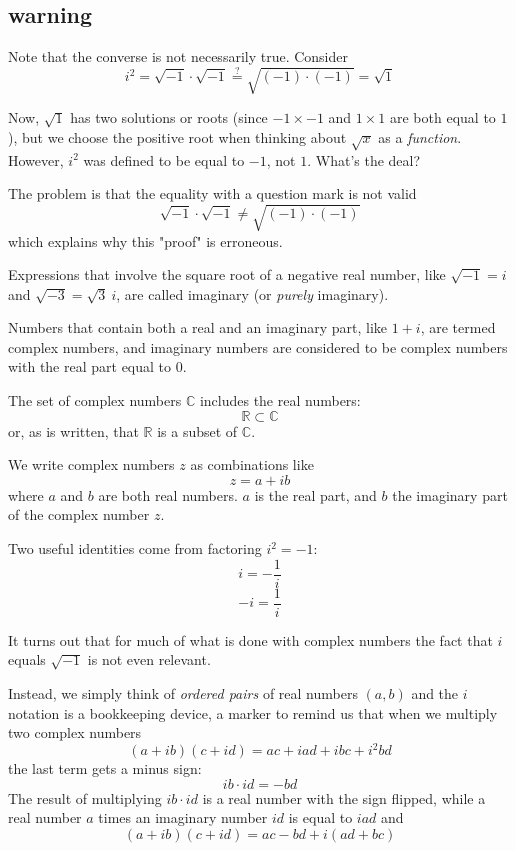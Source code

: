 \documentclass[11pt, oneside]{article}
\begin{document}
\subsection*{warning}

Note that the converse is not necessarily true.  Consider
\[ i^2 = \sqrt{-1} \cdot \sqrt{-1} \stackrel{?}{=} \sqrt{(-1)\cdot (-1)} = \sqrt{1} \]

Now, $\sqrt{1}$ has two solutions or roots (since $-1 \times -1$ and $1 \times 1$ are both equal to $1$), but we choose the positive root when thinking about $\sqrt{x}$ as a \emph{function}.  However, $i^2$ was defined to be equal to $-1$, not $1$.  What's the deal?

The problem is that the equality with a question mark is not valid
\[ \sqrt{-1} \cdot \sqrt{-1} \ne \sqrt{(-1)\cdot (-1)} \]
which explains why this "proof" is erroneous.

Expressions that involve the square root of a negative real number, like $\sqrt{-1} = i$ and $\sqrt{-3} = \sqrt{3}\ i$, are called imaginary (or \emph{purely} imaginary).  

Numbers that contain both a real and an imaginary part, like $1 + i$, are termed complex numbers, and imaginary numbers are considered to be complex numbers with the real part equal to $0$.

The set of complex numbers $\mathbb{C}$ includes the real numbers:
\[ \mathbb{R} \subset \mathbb{C} \]
or, as is written, that $\mathbb{R}$ is a subset of $\mathbb{C}$.

We write complex numbers $z$ as combinations like
\[ z = a + ib \]
 where $a$ and $b$ are both real numbers.  $a$ is the real part, and $b$ the imaginary part of the complex number $z$.

Two useful identities come from factoring $i^2 = -1$:
\[ i = -\frac{1}{i}  \]
\[ -i = \frac{1}{i} \]

It turns out that for much of what is done with complex numbers the fact that $i$ equals $\sqrt{-1}$ is not even relevant.

Instead, we simply think of \emph{ordered pairs} of real numbers $(a,b)$ and the $i$ notation is a bookkeeping device, a marker to remind us that when we multiply two complex numbers
\[ (a + ib) (c + id) = ac + iad + ibc + i^2bd \]
the last term gets a minus sign:
\[ ib \cdot id = -bd \]
The result of multiplying $ib \cdot id$ is a real number with the sign flipped, while a real number $a$ times an imaginary number $id$ is equal to $iad$ and
\[ (a + ib) (c + id) = ac -bd + i(ad + bc) \]
\end{document}
